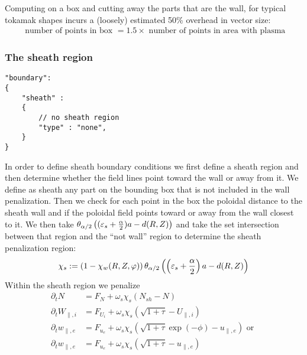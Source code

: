 \begin{tcolorbox}[title=Note]
    Computing on a box and cutting away the parts that are the wall,
    for typical tokamak shapes incurs a (loosely) estimated 50\% overhead in vector size:
    \begin{align*}
        \text{ number of points in box } = 1.5 \times \text{ number of points in area with plasma}
    \end{align*}
\end{tcolorbox}

\subsubsection{The sheath region}
\begin{verbatim}
"boundary":
{
    "sheath" :
    {
        // no sheath region
        "type" : "none",
    }
}
\end{verbatim}
In order to define sheath boundary conditions we first define a sheath region
and then determine whether the field lines point toward the wall or away from it.
We define as sheath any part on the bounding box that is not included in the wall
penalization. Then we check for each point in the box the poloidal distance to
the sheath wall and if the poloidal field points toward or away from the wall closest
to it.
We then take $\theta_{\alpha/2}\left( (\varepsilon_s + \frac{\alpha}{2})a - d(R,Z)\right)$
and take the set intersection between that region and the ``not wall'' region to
determine the sheath penalization region:
\begin{align}\label{eq:sheath}
    \chi_s := \left(1-\chi_w(R,Z,\varphi)\right) \theta_{\alpha/2}\left( \left(\varepsilon_s + \frac{\alpha}{2}\right)a - d(R,Z)\right)
\end{align}
Within the sheath region we penalize
\begin{subequations} \label{eq:sheath_penalization}
\begin{align}
    \partial_t N &= F_N +\omega_s \chi_s \left(N_{sh}-N\right)\\
    \partial_t W_{\parallel,i} &= F_{U_i} +\omega_s \chi_s \left(\sqrt{1+\tau} - U_{\parallel,i} \right) \\
    \partial_t w_{\parallel,e} &= F_{u_e} +\omega_s \chi_s \left(\sqrt{1+\tau}\exp(-\phi) - u_{\parallel,e} \right)
    \text{ or } \label{eq:bohm_sheath}\\
    \partial_t w_{\parallel,e} &= F_{u_e} +\omega_s \chi_s \left(\sqrt{1+\tau} - u_{\parallel,e} \right) \label{eq:insulating_sheath}
\end{align}
\end{subequations}
